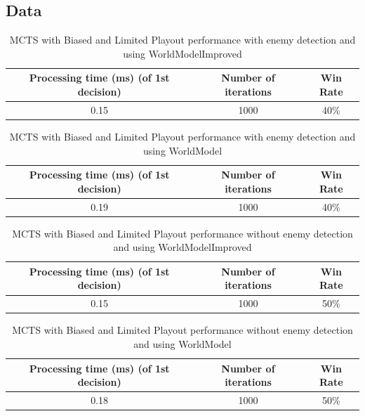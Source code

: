 \documentclass{article}
\begin{document}
  \subsection{Data}
  \begin{table}[h!]
    \centering
    \caption{MCTS with Biased and Limited Playout performance with enemy detection and using WorldModelImproved}
    \label{tab:tableLimitedBiasedMCTS1}
    \begin{tabular}{c|c|c}
      \textbf{Processing time (ms) (of 1st decision)} & \textbf{Number of iterations} & \textbf{Win Rate}\\
      \hline
      0.15 & 1000 & 40\%
    \end{tabular}
  \end{table}
  \begin{table}[h!]
    \centering
    \caption{MCTS with Biased and Limited Playout performance with enemy detection and using WorldModel}
    \label{tab:tableLimitedBiasedMCTS2}
    \begin{tabular}{c|c|c}
      \textbf{Processing time (ms) (of 1st decision)} & \textbf{Number of iterations} & \textbf{Win Rate}\\
      \hline
      0.19 & 1000 & 40\%
    \end{tabular}
  \end{table}
  \begin{table}[h!]
    \centering
    \caption{MCTS with Biased and Limited Playout performance without enemy detection and using WorldModelImproved}
    \label{tab:tableLimitedBiasedMCTS3}
    \begin{tabular}{c|c|c}
      \textbf{Processing time (ms) (of 1st decision)} & \textbf{Number of iterations} & \textbf{Win Rate}\\
      \hline
      0.15 & 1000 & 50\%
    \end{tabular}
  \end{table}
  \begin{table}[h!]
    \centering
    \caption{MCTS with Biased and Limited Playout performance without enemy detection and using WorldModel}
    \label{tab:tableLimitedBiasedMCTS4}
    \begin{tabular}{c|c|c}
      \textbf{Processing time (ms) (of 1st decision)} & \textbf{Number of iterations} & \textbf{Win Rate}\\
      \hline
      0.18 & 1000 & 50\%
    \end{tabular}
  \end{table}
\end{document}
